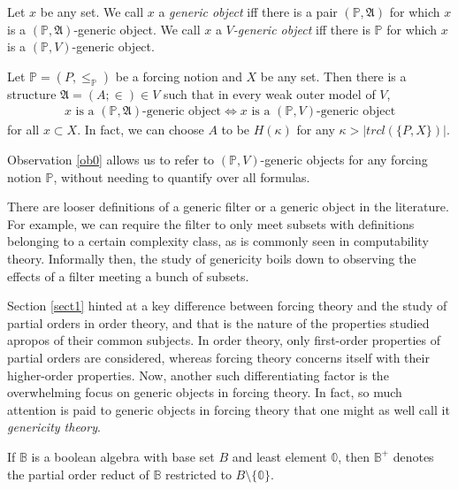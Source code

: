 \documentclass[12pt]{article}
\numberwithin{equation}{section}
\begin{document}
\begin{defi}
Let $x$ be any set. We call $x$ a \emph{generic object} iff there is a pair $(\mathbb{P}, \mathfrak{A})$ for which $x$ is a $(\mathbb{P}, \mathfrak{A})$-generic object. We call $x$ a $V$\emph{-generic object} iff there is $\mathbb{P}$ for which $x$ is a $(\mathbb{P}, V)$-generic object.
\end{defi}

\begin{ob}\label{ob0}
Let $\mathbb{P} = (P, \leq_{\mathbb{P}})$ be a forcing notion and $X$ be any set. Then there is a structure $\mathfrak{A} = (A; \in) \in V$ such that in every weak outer model of $V$, 
\begin{align*}
    x \text{ is a } (\mathbb{P}, \mathfrak{A}) \text{-generic object} \iff x \text{ is a } (\mathbb{P}, V) \text{-generic object}
\end{align*}
for all $x \subset X$. In fact, we can choose $A$ to be $H(\kappa)$ for any $\kappa > |trcl(\{P, X\})|$.
\end{ob}

Observation \ref{ob0} allows us to refer to $(\mathbb{P}, V)$-generic objects for any forcing notion $\mathbb{P}$, without needing to quantify over all formulas.

There are looser definitions of a generic filter or a generic object in the literature. For example, we can require the filter to only meet subsets with definitions belonging to a certain complexity class, as is commonly seen in computability theory. Informally then, the study of genericity boils down to observing the effects of a filter meeting a bunch of subsets. 

Section \ref{sect1} hinted at a key difference between forcing theory and the study of partial orders in order theory, and that is the nature of the properties studied apropos of their common subjects. In order theory, only first-order properties of partial orders are considered, whereas forcing theory concerns itself with their higher-order properties. Now, another such differentiating factor is the overwhelming focus on generic objects in forcing theory. In fact, so much attention is paid to generic objects in forcing theory that one might as well call it \emph{genericity theory}.

\begin{defi}
If $\mathbb{B}$ is a boolean algebra with base set $B$ and least element $\mathbb{0}$, then $\mathbb{B}^+$ denotes the partial order reduct of $\mathbb{B}$ restricted to $B \setminus \{\mathbb{0}\}$.
\end{defi}
\end{document}
